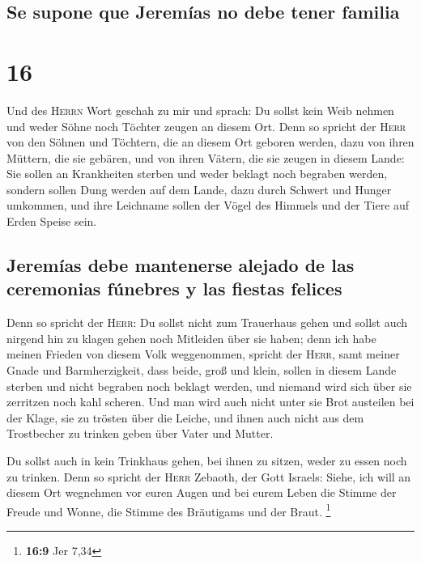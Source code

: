 \hypertarget{se-supone-que-jeremuxedas-no-debe-tener-familia}{%
\subsection{Se supone que Jeremías no debe tener
familia}\label{se-supone-que-jeremuxedas-no-debe-tener-familia}}

\hypertarget{section-15}{%
\section{16}\label{section-15}}

 Und des \textsc{Herrn} Wort geschah zu mir und sprach:
 Du sollst kein Weib nehmen und weder Söhne noch Töchter
zeugen an diesem Ort.  Denn so spricht der \textsc{Herr}
von den Söhnen und Töchtern, die an diesem Ort geboren werden, dazu von
ihren Müttern, die sie gebären, und von ihren Vätern, die sie zeugen in
diesem Lande:  Sie sollen an Krankheiten sterben und weder
beklagt noch begraben werden, sondern sollen Dung werden auf dem Lande,
dazu durch Schwert und Hunger umkommen, und ihre Leichname sollen der
Vögel des Himmels und der Tiere auf Erden Speise sein.

\hypertarget{jeremuxedas-debe-mantenerse-alejado-de-las-ceremonias-fuxfanebres-y-las-fiestas-felices}{%
\subsection{Jeremías debe mantenerse alejado de las ceremonias fúnebres
y las fiestas
felices}\label{jeremuxedas-debe-mantenerse-alejado-de-las-ceremonias-fuxfanebres-y-las-fiestas-felices}}

 Denn so spricht der \textsc{Herr}: Du sollst nicht zum
Trauerhaus gehen und sollst auch nirgend hin zu klagen gehen noch
Mitleiden über sie haben; denn ich habe meinen Frieden von diesem Volk
weggenommen, spricht der \textsc{Herr}, samt meiner Gnade und
Barmherzigkeit,  dass beide, groß und klein, sollen in
diesem Lande sterben und nicht begraben noch beklagt werden, und niemand
wird sich über sie zerritzen noch kahl scheren.  Und man
wird auch nicht unter sie Brot austeilen bei der Klage, sie zu trösten
über die Leiche, und ihnen auch nicht aus dem Trostbecher zu trinken
geben über Vater und Mutter.

 Du sollst auch in kein Trinkhaus gehen, bei ihnen zu
sitzen, weder zu essen noch zu trinken.  Denn so spricht
der \textsc{Herr} Zebaoth, der Gott Israels: Siehe, ich will an diesem
Ort wegnehmen vor euren Augen und bei eurem Leben die Stimme der Freude
und Wonne, die Stimme des Bräutigams und der Braut. \footnote{\textbf{16:9}
  Jer 7,34}

